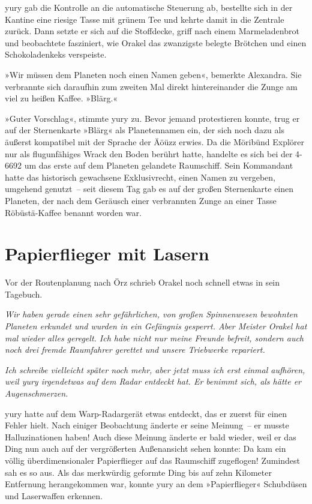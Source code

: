 yury gab die Kontrolle an die automatische Steuerung ab, bestellte sich in der Kantine eine riesige Tasse mit grünem Tee und kehrte damit in die Zentrale zurück. Dann setzte er sich auf die Stoffdecke, griff nach einem Marmeladenbrot und beobachtete fasziniert, wie Orakel das zwanzigste belegte Brötchen und einen Schokoladenkeks verspeiste.

»Wir müssen dem Planeten noch einen Namen geben«, bemerkte Alexandra. Sie verbrannte sich daraufhin zum zweiten Mal direkt hintereinander die Zunge am viel zu heißen Kaffee. »Blärg.«

»Guter Vorschlag«, stimmte yury zu. Bevor jemand protestieren konnte, trug er auf der Sternenkarte »Blärg« als Planetennamen ein, der sich noch dazu als äußerst kompatibel mit der Sprache der Äöüzz erwies. Da die Möribünd Explörer nur als flugunfähiges Wrack den Boden berührt hatte, handelte es sich bei der 4-6692 um das erste auf dem Planeten gelandete Raumschiff. Sein Kommandant hatte das historisch gewachsene Exklusivrecht, einen Namen zu vergeben, umgehend genutzt~– seit diesem Tag gab es auf der großen Sternenkarte einen Planeten, der nach dem Geräusch einer verbrannten Zunge an einer Tasse Röbüstä-Kaffee benannt worden war.


\chapter{Papierflieger mit Lasern}

Vor der Routenplanung nach Örz schrieb Orakel noch schnell etwas in sein Tagebuch.

\textit{Wir haben gerade einen sehr gefährlichen, von großen Spinnenwesen bewohnten Planeten erkundet und wurden in ein Gefängnis gesperrt. Aber Meister Orakel hat mal wieder alles geregelt. Ich habe nicht nur meine Freunde befreit, sondern auch noch drei fremde Raumfahrer gerettet und unsere Triebwerke repariert.}

\textit{Ich schreibe vielleicht später noch mehr, aber jetzt muss ich erst einmal aufhören, weil yury irgendetwas auf dem Radar entdeckt hat. Er benimmt sich, als hätte er Augenschmerzen.}

yury hatte auf dem Warp-Radargerät etwas entdeckt, das er zuerst für einen Fehler hielt. Nach einiger Beobachtung änderte er seine Meinung~– er musste Halluzinationen haben! Auch diese Meinung änderte er bald wieder, weil er das Ding nun auch auf der vergrößerten Außenansicht sehen konnte: Da kam ein völlig überdimensionaler Papierflieger auf das Raumschiff zugeflogen! Zumindest sah es so aus. Als das merkwürdig geformte Ding bis auf zehn Kilometer Entfernung herangekommen war, konnte yury an dem »Papierflieger« Schubdüsen und Laserwaffen erkennen.

